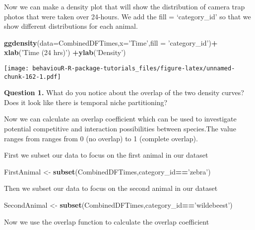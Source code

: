 \documentclass[]{book}
\newenvironment{Shaded}{\begin{snugshade}}{\end{snugshade}}
\newcommand{\DataTypeTok}[1]{\textcolor[rgb]{0.13,0.29,0.53}{#1}}
\newcommand{\KeywordTok}[1]{\textcolor[rgb]{0.13,0.29,0.53}{\textbf{#1}}}
\newcommand{\NormalTok}[1]{#1}
\newcommand{\OperatorTok}[1]{\textcolor[rgb]{0.81,0.36,0.00}{\textbf{#1}}}
\newcommand{\StringTok}[1]{\textcolor[rgb]{0.31,0.60,0.02}{#1}}
\begin{document}
Now we can make a density plot that will show the distribution of camera trap photos that were taken over 24-hours. We add the fill = `category\_id' so that we show different distributions for each animal.

\begin{Shaded}
\begin{Highlighting}[]
\KeywordTok{ggdensity}\NormalTok{(}\DataTypeTok{data=}\NormalTok{CombinedDFTimes,}\DataTypeTok{x=}\StringTok{'Time'}\NormalTok{,}\DataTypeTok{fill =} \StringTok{'category_id'}\NormalTok{)}\OperatorTok{+}
\StringTok{  }\KeywordTok{xlab}\NormalTok{(}\StringTok{'Time (24 hrs)'}\NormalTok{) }\OperatorTok{+}\KeywordTok{ylab}\NormalTok{(}\StringTok{'Density'}\NormalTok{)}
\end{Highlighting}
\end{Shaded}

\texttt{[image: behaviouR-R-package-tutorials\_files/figure-latex/unnamed-chunk-162-1.pdf]}

\textbf{Question 1.} What do you notice about the overlap of the two density curves? Does it look like there is temporal niche partitioning?

Now we can calculate an overlap coefficient which can be used to investigate potential competitive and interaction possibilities between species.The value ranges from ranges from 0 (no overlap) to 1 (complete overlap).

First we subset our data to focus on the first animal in our dataset

\begin{Shaded}
\begin{Highlighting}[]
\NormalTok{FirstAnimal <-}\StringTok{ }\KeywordTok{subset}\NormalTok{(CombinedDFTimes,category_id}\OperatorTok{==}\StringTok{'zebra'}\NormalTok{)}
\end{Highlighting}
\end{Shaded}

Then we subset our data to focus on the second animal in our dataset

\begin{Shaded}
\begin{Highlighting}[]
\NormalTok{SecondAnimal <-}\StringTok{ }\KeywordTok{subset}\NormalTok{(CombinedDFTimes,category_id}\OperatorTok{==}\StringTok{'wildebeest'}\NormalTok{)}
\end{Highlighting}
\end{Shaded}

Now we use the overlap function to calculate the overlap coefficient
\end{document}
